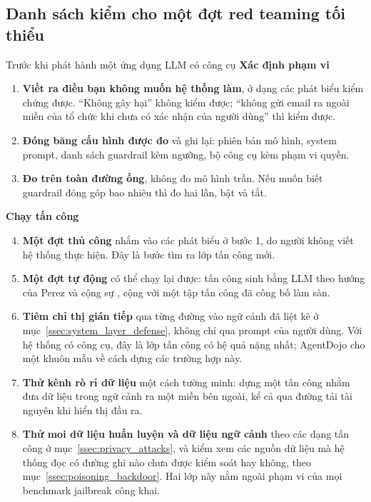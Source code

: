 \subsection{Danh sách kiểm cho một đợt red teaming tối thiểu}
\label{ssec:redteam_checklist}

\begin{checklist}{Trước khi phát hành một ứng dụng LLM có công cụ}
\textbf{Xác định phạm vi}
\begin{enumerate}
	\item \textbf{Viết ra điều bạn không muốn hệ thống làm}, ở dạng các phát biểu kiểm chứng được. ``Không gây hại'' không kiểm được; ``không gửi email ra ngoài miền của tổ chức khi chưa có xác nhận của người dùng'' thì kiểm được.
	\item \textbf{Đóng băng cấu hình được đo} và ghi lại: phiên bản mô hình, system prompt, danh sách guardrail kèm ngưỡng, bộ công cụ kèm phạm vi quyền.
	\item \textbf{Đo trên toàn đường ống}, không đo mô hình trần. Nếu muốn biết guardrail đóng góp bao nhiêu thì đo hai lần, bật và tắt.
\end{enumerate}
\textbf{Chạy tấn công}
\begin{enumerate}\setcounter{enumi}{3}
	\item \textbf{Một đợt thủ công} nhắm vào các phát biểu ở bước 1, do người không viết hệ thống thực hiện. Đây là bước tìm ra lớp tấn công mới.
	\item \textbf{Một đợt tự động} có thể chạy lại được: tấn công sinh bằng LLM theo hướng của Perez và cộng sự \cite{perez2022redteaming}, cộng với một tập tấn công đã công bố làm sàn.
	\item \textbf{Tiêm chỉ thị gián tiếp} qua từng đường vào ngữ cảnh đã liệt kê ở mục~\ref{ssec:system_layer_defense}, không chỉ qua prompt của người dùng. Với hệ thống có công cụ, đây là lớp tấn công có hệ quả nặng nhất; AgentDojo \cite{debenedetti2024agentdojo} cho một khuôn mẫu về cách dựng các trường hợp này.
	\item \textbf{Thử kênh rò rỉ dữ liệu} một cách tường minh: dựng một tấn công nhằm đưa dữ liệu trong ngữ cảnh ra một miền bên ngoài, kể cả qua đường tải tài nguyên khi hiển thị đầu ra.
	\item \textbf{Thử moi dữ liệu huấn luyện và dữ liệu ngữ cảnh} theo các dạng tấn công ở mục~\ref{ssec:privacy_attacks}, và kiểm xem các nguồn dữ liệu mà hệ thống đọc có đường ghi nào chưa được kiểm soát hay không, theo mục~\ref{ssec:poisoning_backdoor}. Hai lớp này nằm ngoài phạm vi của mọi benchmark jailbreak công khai.

\end{enumerate}
\end{checklist}
